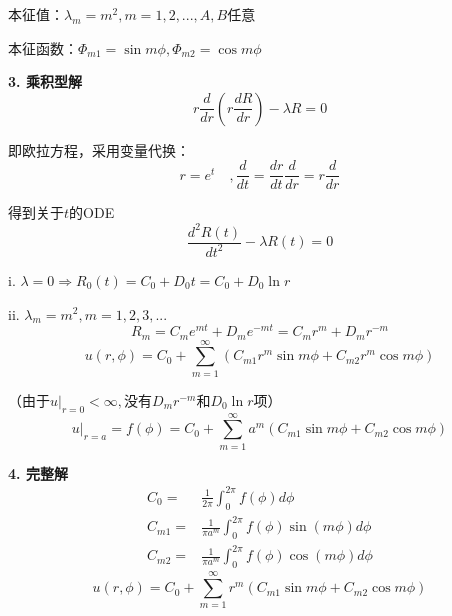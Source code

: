 \begin{ex}[极坐标下的稳态传热问题]
    本征值：$\lambda_m=m^2,m=1,2,...,A,B$任意

    本征函数：$\Phi_{m1}=\sin{m\phi},\Phi_{m2}=\cos{m\phi}$

    \textbf{3. 乘积型解}
    $$r\frac{d}{d r}\left(r\frac{dR}{dr}\right)-\lambda R=0$$

    即欧拉方程，采用变量代换：
    $$r=e^t\quad,\frac{d}{dt}=\frac{dr}{dt}\frac{d}{dr}=r\frac{d}{dr}$$

    得到关于$t$的ODE
    $$\frac{d^2R(t)}{dt^2}-\lambda R(t)=0$$

    i. $\lambda=0\Rightarrow R_0(t)=C_0+D_0t=C_0+D_0\ln r$

    ii. $\lambda_m=m^2,m=1,2,3,...$
      $$R_m=C_me^{mt}+D_me^{-mt}=C_mr^m+D_mr^{-m}$$
    $$u(r,\phi)=C_0+\sum_{m=1}^\infty \left(C_{m1}r^m\sin{m\phi}+C_{m2}r^m\cos{m\phi}\right)$$

    （由于$u|_{r=0}<\infty,$没有$D_{m}r^{-m}$和$D_0\ln r$项）
    $$u|_{r=a}=f(\phi)=C_0+\sum_{m=1}^\infty a^m\left(C_{m1}\sin{m\phi}+C_{m2}\cos{m\phi}\right)$$

    \textbf{4. 完整解}
    $$\begin{aligned}
    C_0=&\frac{1}{2\pi}\int_0^{2\pi}f(\phi)d\phi\\
    C_{m1}=&\frac{1}{\pi  a^m}\int_0^{2\pi}f(\phi)\sin(m\phi)d\phi\\
    C_{m2}=&\frac{1}{\pi  a^m}\int_0^{2\pi}f(\phi)\cos(m\phi)d\phi
    \end{aligned}$$
    $$u(r,\phi)=C_0+\sum_{m=1}^\infty r^m\left(C_{m1}\sin{m\phi}+C_{m2}\cos{m\phi}\right)$$
\end{ex}
